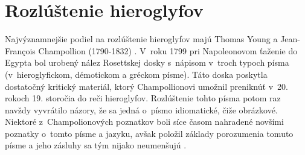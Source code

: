 \documentclass[11pt,a4paper,titlepage]{article}
\begin{document}
\section{Rozlúštenie hieroglyfov}
Najvýznamnejšie podiel na rozlúštenie hieroglyfov majú Thomas Young \cite{Thomas_Description} a Jean-François Champollion \cite{Jean_Description} (1790-1832) \cite{bc_praca_1}. V~roku 1799 pri Napoleonovom ťaženie do Egypta bol urobený nález Rosettskej dosky s~nápisom v~troch typoch písma (v~hieroglyfickom, démotickom a gréckom písme). Táto doska poskytla dostatočný kritický materiál, ktorý Champollionovi umožnil preniknúť v~20. rokoch 19. storočia do reči hieroglyfov. Rozlúštenie tohto písma potom raz navždy vyvrátilo názory, že sa jedná o~písmo idiomatické, čiže obrázkové. Niektoré z~Champolionových poznatkov boli síce časom nahradené novšími poznatky o~tomto písme a jazyku, avšak položil základy porozumenia tomuto písme a jeho zásluhy sa tým nijako neumenšujú \cite{bc_praca_2}.

\newpage

\end{document}
